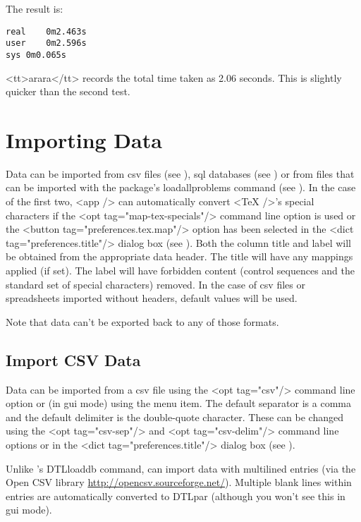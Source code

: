    The result is:

\begin{verbatim}
real	0m2.463s
user	0m2.596s
sys	0m0.065s
\end{verbatim}

  <tt>arara</tt> records the total time taken as 2.06 seconds.
  This is slightly quicker than the second  test.


\chapter{Importing Data}\label{sec:import}

   Data can be imported from \gls{csv} files (see 
   ), \gls{sql} databases (see 
   ) or from files that can be imported with 
   the  package's \gls{loadallproblems} command
   (see ). In the case of the first
   two, <app /> can automatically convert <TeX />'s special characters if the
   <opt tag="map-tex-specials"/> command line option is used or the
   <button tag="preferences.tex.map"/> option has been selected in the 
   <dict tag="preferences.title"/> dialog box (see ).
   Both the column title and label will be obtained from the appropriate data 
   header.  The title will have any mappings applied (if set). The label will 
   have forbidden content (control sequences and the standard set of special 
   characters) removed. In the case of \gls{csv} files or spreadsheets
   imported without headers, default values will be used.


   Note that data can't be exported back to any of those formats.


\section{Import CSV Data}\label{sec:importcsv}

   Data can be imported from a \gls{csv} file using
   the <opt tag="csv"/> command line option or (in \gls{gui} mode)
   using the  menu item. The default
   separator is a comma and the default delimiter is the double-quote
   character. These can be changed using the <opt tag="csv-sep"/> and 
   <opt tag="csv-delim"/> command line options or in the 
   <dict tag="preferences.title"/>
   dialog box (see ).

Unlike 's
   \gls{DTLloaddb} command,  can import data with multilined
   entries (via the Open CSV library 
   \url{http://opencsv.sourceforge.net/}).
   Multiple blank lines within entries are automatically converted to
   \gls{DTLpar} (although you won't see this in \gls{gui}
   mode).


